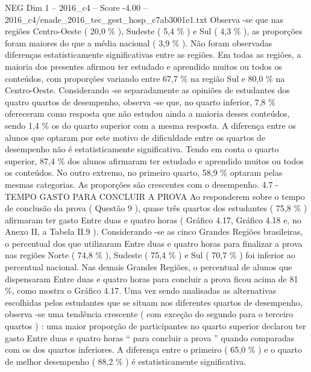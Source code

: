 \begin{textsample}{NEG Dim 1 – 2016\_c4 – Score -4.00 – 2016\_c4/enade\_2016\_tec\_gest\_hosp\_c7ab3001e1.txt}
Observa -se que nas regiões Centro-Oeste ( 20,0 \% ), Sudeste ( 5,4 \% ) e Sul ( 4,3 \% ), as proporções foram maiores do que a média nacional ( 3,9 \% ).
Não foram observadas diferenças estatisticamente significativas entre as regiões.
Em todas as regiões, a maioria dos presentes afirmou ter estudado e aprendido muitos ou todos os conteúdos, com proporções variando entre 67,7 \% na região Sul e 80,0 \% na Centro-Oeste.
Considerando -se separadamente as opiniões de estudantes dos quatro quartos de desempenho, observa -se que, no quarto inferior, 7,8 \% ofereceram como resposta que não estudou ainda a maioria desses conteúdos, sendo 1,4 \% os do quarto superior com a mesma resposta.
A diferença entre os alunos que optaram por este motivo de dificuldade entre os quartos de desempenho não é estatisticamente significativa.
Tendo em conta o quarto superior, 87,4 \% dos alunos afirmaram ter estudado e aprendido muitos ou todos os conteúdos.
No outro extremo, no primeiro quarto, 58,9 \% optaram pelas mesmas categorias.
As proporções são crescentes com o desempenho. 4.7 - TEMPO GASTO PARA CONCLUIR A PROVA Ao responderem sobre o tempo de conclusão da prova ( Questão 9 ), quase três quartos dos estudantes ( 75,8 \% ) afirmaram ter gasto Entre duas e quatro horas ( Gráfico 4.17, Gráfico 4.18 e, no Anexo II, a Tabela II.9 ).
Considerando -se as cinco Grandes Regiões brasileiras, o percentual dos que utilizaram Entre duas e quatro horas para finalizar a prova nas regiões Norte ( 74,8 \% ), Sudeste ( 75,4 \% ) e Sul ( 70,7 \% ) foi inferior ao percentual nacional.
Nas demais Grandes Regiões, o percentual de alunos que dispensaram Entre duas e quatro horas para concluir a prova ficou acima de 81 \%, como mostra o Gráfico 4.17.
Uma vez sendo analisadas as alternativas escolhidas pelos estudantes que se situam nos diferentes quartos de desempenho, observa -se uma tendência crescente ( com exceção do segundo para o terceiro quartos ) : uma maior proporção de participantes no quarto superior declarou ter gasto Entre duas e quatro horas “ para concluir a prova ” quando comparadas com os dos quartos inferiores.
A diferença entre o primeiro ( 65,0 \% ) e o quarto de melhor desempenho ( 88,2 \% ) é estatisticamente significativa.

\end{textsample}

